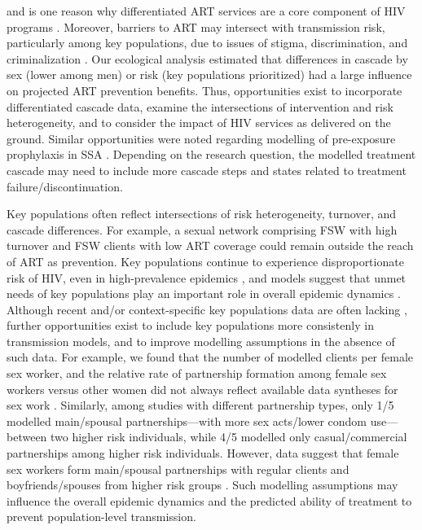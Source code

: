 and is one reason why differentiated ART services are a core component of HIV programs
\cite{Chikwari2018,Ehrenkranz2019}.
Moreover, barriers to ART may intersect with transmission risk, particularly among key populations,
due to issues of stigma, discrimination, and criminalization \cite{Ortblad2019,Baral2019}.
Our ecological analysis estimated that
differences in cascade by sex (lower among men) or risk (key populations prioritized)
had a large influence on projected ART prevention benefits.
Thus, opportunities exist to incorporate differentiated cascade data,
examine the intersections of intervention and risk heterogeneity, and
to consider the impact of HIV services as delivered on the ground.
Similar opportunities were noted regarding modelling of pre-exposure prophylaxis in SSA \cite{Case2019}.
Depending on the research question, the modelled treatment cascade may need
to include more cascade steps and states related to treatment failure/discontinuation.
\par
Key populations often reflect intersections of risk heterogeneity, turnover, and cascade differences.
For example, a sexual network comprising FSW with high turnover and FSW clients with low ART coverage
could remain outside the reach of ART as prevention.
Key populations continue to experience disproportionate risk of HIV,
even in high-prevalence epidemics \cite{AIDSinfo},
and models suggest that unmet needs of key populations
play an important role in overall epidemic dynamics \cite{Bekker2015,Stone2021}.
Although recent and/or context-specific key populations data are often lacking \cite{Rao2018},
further opportunities exist to include key populations more consistenly in transmission models,
and to improve modelling assumptions in the absence of such data.
For example, we found that the number of modelled clients per female sex worker, and
the relative rate of partnership formation among female sex workers versus other women
did not always reflect available data syntheses for sex work \cite{Watts2010,Scorgie2012}.
Similarly, among studies with different partnership types, only 1/5 modelled
main/spousal partnerships---with more sex acts/lower condom use---between two higher risk individuals,
while 4/5 modelled only casual/commercial partnerships among higher risk individuals.
However, data suggest that female sex workers form main/spousal partnerships
with regular clients and boyfriends/spouses from higher risk groups \cite{Scorgie2012}.
Such modelling assumptions may influence the overall epidemic dynamics
and the predicted ability of treatment to prevent population-level transmission.
